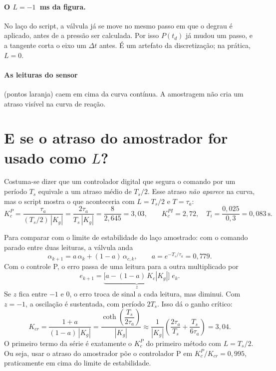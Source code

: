 \documentclass[11pt,a4paper]{article}
\begin{document}
\paragraph{O $L = -1$~ms da figura.} No laço do script, a válvula já se move no mesmo passo em
que o degrau é aplicado, antes de a pressão ser calculada. Por isso $P(t_d)$ já mudou um passo,
e a tangente corta o eixo um $\Delta t$ antes. É um artefato da discretização; na prática, $L = 0$.

\paragraph{As leituras do sensor} (pontos laranja) caem em cima da curva contínua. A amostragem
não cria um atraso visível na curva de reação.

\section{E se o atraso do amostrador for usado como $L$?}

Costuma-se dizer que um controlador digital que segura o comando por um período $T_s$ equivale a
um atraso médio de $T_s/2$. Esse atraso \emph{não aparece} na curva, mas o script mostra o que
aconteceria com $L = T_s/2$ e $T = \tau_a$:
\begin{equation}
  K_c^{P} = \frac{\tau_a}{(T_s/2)\,|K_g|} = \frac{2\tau_a}{T_s\,|K_g|}
          = \frac{8}{2{,}645} = 3{,}03,\qquad
  K_c^{PI} = 2{,}72,\quad T_i = \frac{0{,}025}{0{,}3} = 0{,}083\ \text{s}.
\end{equation}

Para comparar com o limite de estabilidade do laço amostrado: com o comando parado entre duas
leituras, a válvula anda
\begin{equation}
  \alpha_{k+1} = a\,\alpha_k + (1-a)\,\alpha_{c,k},\qquad a = e^{-T_s/\tau_a} = 0{,}779 .
\end{equation}
Com o controle P, o erro passa de uma leitura para a outra multiplicado por
\begin{equation}
  e_{k+1} = \underbrace{\bigl[a - (1-a)\,K_c|K_g|\bigr]}_{z}\; e_k .
\end{equation}
Se $z$ fica entre $-1$ e $0$, o erro troca de sinal a cada leitura, mas diminui. Com
$z = -1$, a oscilação é sustentada, com período $2T_s$. Isso dá o ganho crítico:
\begin{equation}
  K_{cr} = \frac{1 + a}{(1 - a)\,|K_g|} = \frac{\coth\!\left(\dfrac{T_s}{2\tau_a}\right)}{|K_g|}
         \approx \frac{1}{|K_g|}\left(\frac{2\tau_a}{T_s} + \frac{T_s}{6\tau_a}\right) = 3{,}04 .
\end{equation}
O primeiro termo da série é exatamente o $K_c^P$ do primeiro método com $L = T_s/2$. Ou seja,
usar o atraso do amostrador põe o controlador P em $K_c^P/K_{cr} = 0{,}995$, praticamente em cima
do limite de estabilidade.
\end{document}
